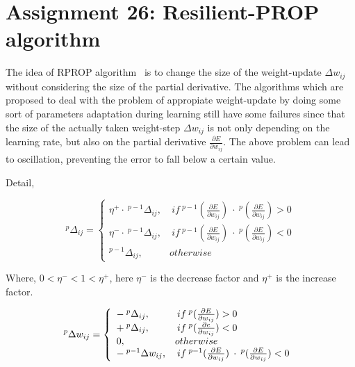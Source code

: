 \documentclass[12pt]{article}
\begin{document}
\section{Assignment 26: Resilient-PROP algorithm}

The idea of RPROP algorithm~\cite{riedmiller1993direct} is to change the size of the weight-update $\Delta w_{ij}$ 
without considering the size of the partial derivative. The algorithms 
which are proposed to deal with the problem of appropiate weight-update by doing
some sort of parameters adaptation during learning still have some failures since that
the size of the actually taken weight-step $\Delta w_{ij}$ is not only depending
on the learning rate, but also on the partial derivative $ \frac{\partial E}{\partial w_{ij}} $.
The above problem can lead to oscillation, preventing the error to fall below a certain value.

Detail,

\begin{equation}
    ^{p}\Delta_{ij} = \left\{ 
                        \begin{array}{ll}
                            \eta^{+} \cdot\: ^{p-1}\Delta_{ij}, & \:if\: ^{p-1}(\frac{\partial E}{\partial w_{ij}}) \:\cdot\: ^{p}(\frac{\partial E}{\partial w_{ij}}) > 0 \\
                            \eta^{-} \cdot\: ^{p-1}\Delta_{ij}, & \:if\: ^{p-1}(\frac{\partial E}{\partial w_{ij}}) \:\cdot\: ^{p}(\frac{\partial E}{\partial w_{ij}}) < 0 \\
                                             ^{p-1}\Delta_{ij}, & otherwise
                        \end{array}
                      \right.
\end{equation}

Where, $ 0 < \eta^{-} < 1 < \eta^{+} $, here $\eta^{-}$ is the decrease factor
and $\eta^{+}$ is the increase factor.

\begin{equation}
    ^{p}\Delta w_{ij} = \left\{
                            \begin{array}{ll}
                                -\:^{p}\Delta_{ij}, & \:if\: ^{p}(\frac{\partial E}{\partial w_{ij}}) > 0 \\
                                +\:^{p}\Delta_{ij}, & \:if\: ^{p}(\frac{\partial e}{\partial w_{ij}}) < 0 \\
                                0, & otherwise $$ \\
                                -\:^{p-1} \Delta w_{ij}, & \:if\: ^{p-1}(\frac{\partial E}{\partial w_{ij}}) \:\cdot\: ^{p}(\frac{\partial E}{\partial w_{ij}}) < 0 \\
                            \end{array}
                        \right. \\
\end{equation}
\end{document}
